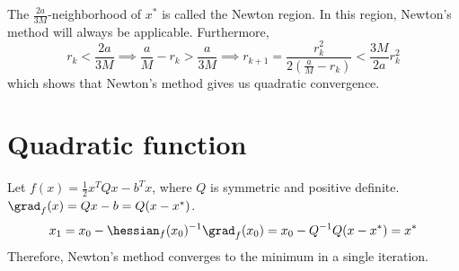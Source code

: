 The $\frac{2a}{3M}$-neighborhood of $x^*$ is called the Newton region.
In this region, Newton's method will always be applicable.
Furthermore,
\[ r_k < \frac{2a}{3M}
\implies \frac{a}{M} - r_k > \frac{a}{3M}
\implies r_{k+1} = \frac{r_k^2}{2(\frac{a}{M}-r_k)} < \frac{3M}{2a} r_k^2 \]
which shows that Newton's method gives us quadratic convergence.

\section{Quadratic function}

Let $f(x) = \frac{1}{2}x^TQx - b^Tx$, where $Q$ is symmetric and positive definite.
$\grad_f(x) = Qx - b = Q(x - x^*)$.
\[ x_1 = x_0 - \hessian_f(x_0)^{-1}\grad_f(x_0)
= x_0 - Q^{-1}Q(x - x^*) = x^* \]
Therefore, Newton's method converges to the minimum in a single iteration.


